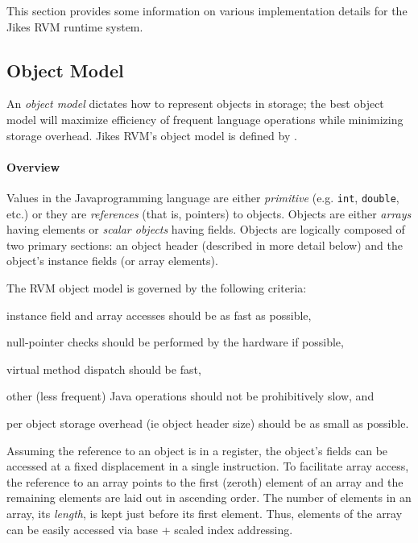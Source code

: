 This section provides some information on various
implementation details for the Jikes RVM runtime system.

\subsection{Object Model} \label{sssec:objects}
An {\em object model} dictates how to represent objects in storage;
the best object model will maximize efficiency of frequent language
operations while minimizing storage overhead. Jikes RVM's object model
is defined by .

\paragraph{Overview}
Values in the Java\trademark programming language are either {\em
primitive} (e.g. {\tt int}, {\tt double}, etc.)  or they are {\em
references} (that is, pointers) to objects.  Objects are either {\em
arrays} having elements or {\em scalar objects} having fields.
Objects are logically composed of two primary sections: an object
header (described in more detail below) and the object's instance
fields (or array elements). 

The RVM object model is governed by the following criteria:
\begin{description}
\item{}
instance field and array accesses should be as fast as possible,
\item{}
null-pointer checks should be performed by the hardware if possible, 
\item{}
virtual method dispatch should be fast,
\item{}
other (less frequent) Java operations should not be prohibitively
slow, and
\item{}
per object storage overhead (ie object header size) should be as small
as possible.
\end{description}

Assuming the reference to an object is in a register, the object's
fields can be accessed at a fixed displacement in a single
instruction.  To facilitate array access, the reference to an array
points to the first (zeroth) element of an array and the remaining
elements are laid out in ascending order.  The number of elements in
an array, its {\em length}, is kept just before its first
element. Thus, elements of the array can be easily accessed via base +
scaled index addressing.


